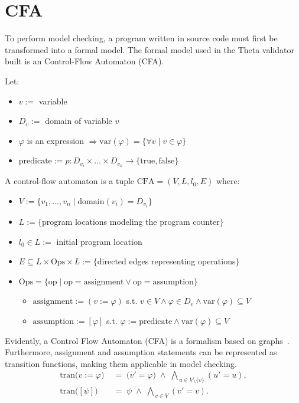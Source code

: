 \section{CFA}

To perform model checking, a program written in source code must first be transformed into a formal model. 
The formal model used in the Theta validator built is an Control-Flow Automaton (CFA).

\begin{definition} Let:
\begin{itemize}
  \item $v :=$ variable
  \item $D_v :=$ domain of variable $v$
  \item $\varphi$ is an expression $\Rightarrow \mathrm{var}(\varphi) = \{\forall v \mid v \in \varphi\}$
  \item $\text{predicate} := p: D_{v_i} \times \dots \times D_{v_n} \to \{\text{true}, \text{false}\}$
\end{itemize}
A control-flow automaton is a tuple $\mathrm{CFA} = (V, L, l_0, E)$ where:
\begin{itemize}
  \item $V := \{v_1, \dots, v_n \mid \mathrm{domain}(v_i) = D_{v_i} \}$
  \item $L := \{$program locations modeling the program counter$\}$
  \item $l_0 \in L :=$ initial program location
  \item $E \subseteq L \times \mathrm{Ops} \times L := \{$directed edges representing operations$\}$
  \item $\mathrm{Ops} = \{ \mathrm{op} \mid \mathrm{op} = \text{assignment} \lor \mathrm{op} = \text{assumption} \}$
  \begin{itemize}
    \item $\text{assignment} := (v := \varphi)$ s.t. $v \in V \land \varphi \in D_v \land \mathrm{var}(\varphi) \subseteq V$
    \item $\text{assumption} := [\varphi]$ s.t. $\varphi := \text{predicate} \land \mathrm{var}(\varphi) \subseteq V$
  \end{itemize}
\end{itemize}
\end{definition}

Evidently, a Control Flow Automaton (CFA) is a formalism based on graphs~\cite{Akos}.
Furthermore, assignment and assumption statements can be represented as transition functions, 
making them applicable in model checking.
\begin{align}
\mathrm{tran}\bigl(v := \varphi\bigr)
&\;=\;
\bigl(v' = \varphi\bigr)
\;\land\;
\bigwedge_{\,u \in V \setminus \{v\}} (u' = u),
\\
\mathrm{tran}\bigl([\psi]\bigr)
&\;=\;
\psi
\;\land\;
\bigwedge_{\,v \in V} (v' = v).
\end{align}

